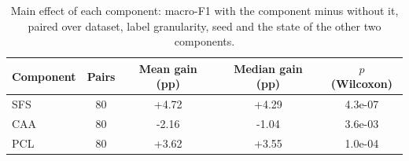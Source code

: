 \begin{table}[t]
\centering
\caption{Main effect of each component: macro-F1 with the component minus without it, paired over dataset, label granularity, seed and the state of the other two components.}
\label{tab:ablation_effects}
\small
\begin{tabular}{lcccc}
\toprule
Component & Pairs & Mean gain (pp) & Median gain (pp) & $p$ (Wilcoxon) \\
\midrule
SFS & 80 & +4.72 & +4.29 & 4.3e-07 \\
CAA & 80 & -2.16 & -1.04 & 3.6e-03 \\
PCL & 80 & +3.62 & +3.55 & 1.0e-04 \\
\bottomrule
\end{tabular}
\end{table}
